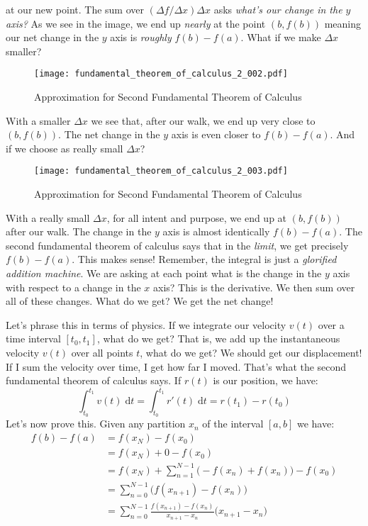 \documentclass{article}
\begin{document}
    at our new point. The sum over $(\Delta{f}/\Delta{x})\Delta{x}$ asks
    \textit{what's our change in the $y$ axis?} As we see in the image, we end up
    \textit{nearly} at the point $(b, f(b))$ meaning our net change in the $y$
    axis is \textit{roughly} $f(b)-f(a)$. What if we make $\Delta{x}$ smaller?
    \begin{figure}
        \centering
        \texttt{[image: fundamental\_theorem\_of\_calculus\_2\_002.pdf]}
        \caption{Approximation for Second Fundamental Theorem of Calculus}
    \end{figure}
    With a smaller $\Delta{x}$ we see that, after our walk, we end up very close
    to $(b,f(b))$. The net change in the $y$ axis is even closer to
    $f(b)-f(a)$. And if we choose as really small $\Delta{x}$?
    \begin{figure}
        \centering
        \texttt{[image: fundamental\_theorem\_of\_calculus\_2\_003.pdf]}
        \caption{Approximation for Second Fundamental Theorem of Calculus}
    \end{figure}
    With a really small $\Delta{x}$, for all intent and purpose, we end up
    at $(b,f(b))$ after our walk. The change in the $y$ axis is almost
    identically $f(b)-f(a)$. The second fundamental theorem of calculus says
    that in the \textit{limit}, we get precisely $f(b)-f(a)$. This makes sense!
    Remember, the integral is just a \textit{glorified addition machine}. We
    are asking at each point what is the change in the $y$ axis with respect to
    a change in the $x$ axis? This is the derivative. We then sum over all of
    these changes. What do we get? We get the net change!
    \par\hfill\par
    Let's phrase this in terms of physics. If we integrate our velocity $v(t)$
    over a time interval $[t_{0},t_{1}]$, what do we get? That is, we add up
    the instantaneous velocity $v(t)$ over all points $t$, what do we get?
    We should get our displacement! If I sum the velocity over time, I get how
    far I moved. That's what the second fundamental theorem of calculus says.
    If $r(t)$ is our position, we have:
    \begin{equation}
        \int_{t_{0}}^{t_{1}}v(t)\;\textrm{d}t
            =\int_{t_{0}}^{t_{1}}r'(t)\;\textrm{d}t
            =r(t_{1})-r(t_{0})
    \end{equation}
    Let's now prove this. Given any partition $x_{n}$ of the interval $[a,b]$
    we have:
    \begin{align}
        f(b)-f(a)&=f(x_{N})-f(x_{0})\\
            &=f(x_{N})+0-f(x_{0})\\
            &=f(x_{N})+\sum_{n=1}^{N-1}\Big(-f(x_{n})+f(x_{n})\Big)-f(x_{0})\\
            &=\sum_{n=0}^{N-1}\Big(f(x_{n+1})-f(x_{n})\Big)\\
            &=\sum_{n=0}^{N-1}\frac{f(x_{n+1})-f(x_{n})}{x_{n+1}-x_{n}}
                \big(x_{n+1}-x_{n}\big)
    \end{align}
\end{document}

